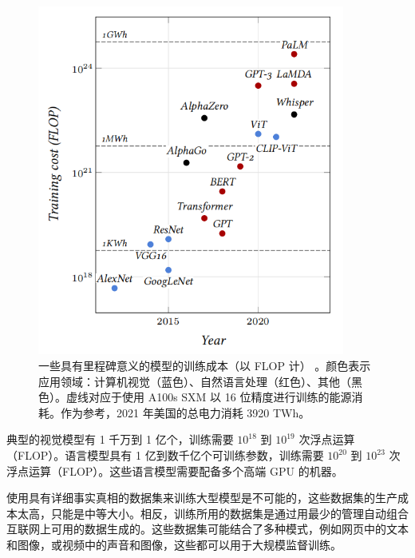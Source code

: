 \begin{figure}
    \centering
    \includegraphics[width=0.9\textwidth]{fig/fig3.7.png}
    \caption[模型训练费用]{一些具有里程碑意义的模型的训练成本（以 FLOP 计） \citep{visualization}。颜色表示应用领域：计算机视觉（蓝色）、自然语言处理（红色）、其他（黑色）。虚线对应于使用 A100s SXM 以 16 位精度进行训练的能源消耗。作为参考，2021 年美国的总电力消耗 3920 TWh。}
    \label{fig3.7}
\end{figure}

典型的视觉模型有 1 千万到 1 亿个，训练需要 $10^{18}$ 到 $10^{19}$ 次浮点运算（FLOP）\citep{arxiv-1512.03385, arxiv-2202.05924}。语言模型具有 1 亿到数千亿个可训练参数，训练需要 $10^{20}$ 到 $10^{23}$ 次浮点运算（FLOP）\citep{arxiv-1810.04805, arxiv-2005.14165, arxiv-2204.02311, arxiv-2202.05924}。这些语言模型需要配备多个高端 GPU 的机器。

使用具有详细事实真相的数据集来训练大型模型是不可能的，这些数据集的生产成本太高，只能是中等大小。相反，训练所用的数据集是通过用最少的管理自动组合互联网上可用的数据生成的。这些数据集可能结合了多种模式，例如网页中的文本和图像，或视频中的声音和图像，这些都可以用于大规模监督训练。

